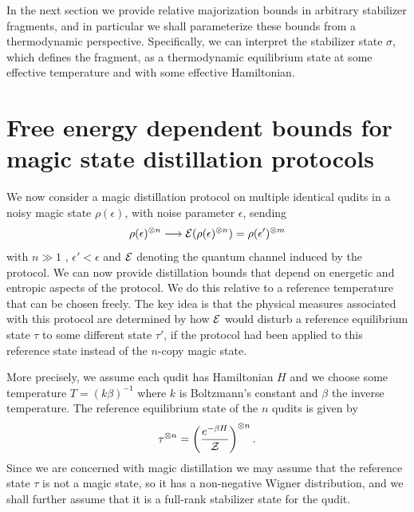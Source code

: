 \documentclass[pra,
aps,
twocolumn,
superscriptaddress,
groupedaddress,
nofootinbib,
reprint
]{revtex4-1}
\begin{document}
In the next section we provide relative majorization bounds in arbitrary stabilizer fragments, and in particular we shall parameterize these bounds from a thermodynamic perspective. Specifically, we can interpret the stabilizer state $\sigma$, which defines the fragment, as a thermodynamic equilibrium state at some effective temperature and with some effective Hamiltonian.

\newpage
\section{Free energy dependent bounds for magic state distillation protocols}
\label{sec:stab}

We now consider a magic distillation protocol on multiple identical qudits in a noisy magic state $\rho(\epsilon)$, with noise parameter $\epsilon$, sending 
\begin{equation}
\rho(\epsilon)^{\otimes n} \longrightarrow {\mathcal E}(\rho(\epsilon)^{\otimes n}) =\rho(\epsilon')^{\otimes m}
\end{equation}
with $n \gg 1$ , $\epsilon' <\epsilon$ and ${\mathcal E}$ denoting the quantum channel induced by the protocol. We can now provide distillation bounds that depend on energetic and entropic aspects of the protocol. We do this relative to a reference temperature that can be chosen freely. The key idea is that the physical measures associated with this protocol are determined by how ${\mathcal E}$ would disturb a reference equilibrium state $\tau$ to some different state $\tau'$, if the protocol had been applied to this reference state instead of the $n$-copy magic state. 

More precisely, we assume each qudit has Hamiltonian $H$ and we choose some temperature $T = (k\beta)^{-1}$ where $k$ is Boltzmann's constant and $\beta$ the inverse temperature. The reference equilibrium state of the $n$ qudits is given by
\begin{equation}
\tau^{\otimes n} = \left ( \frac{e^{-\beta H}}{\mathcal{Z}} \right )  ^{\otimes n}.
\end{equation}
Since we are concerned with magic distillation we may assume that the reference state $\tau$ is not a magic state, so it has a non-negative Wigner distribution, and we shall further assume that it is a full-rank stabilizer state for the qudit. 
\end{document}
